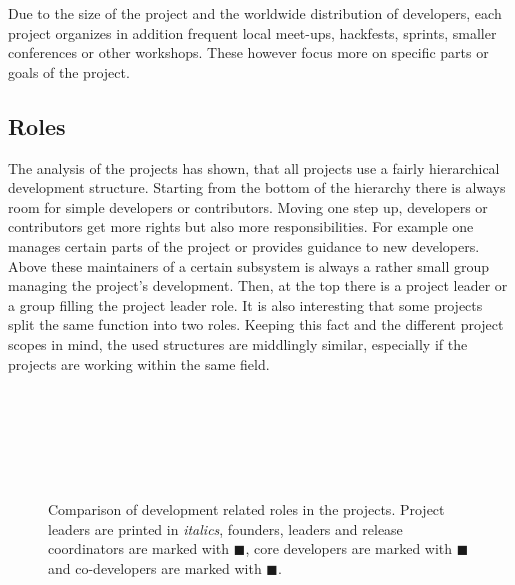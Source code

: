 Due to the size of the project and the worldwide distribution of developers,
each project organizes in addition frequent local meet-ups, hackfests, sprints,
smaller conferences or other workshops. These however focus more on
specific parts or goals of the project.


\subsection{Roles} %

The analysis of the projects has shown, that all projects use a fairly
hierarchical development structure. Starting from the bottom of the hierarchy
there is always room for simple developers or contributors. Moving one step up,
developers or contributors get more rights but also more responsibilities. For
example one manages certain parts of the project or provides guidance to new
developers. Above these maintainers of a certain subsystem is always a rather
small group managing the project's development. Then, at the top there is a
project leader or a group filling the project leader role. It is also
interesting that some projects split the same function into two roles. Keeping
this fact and the different project scopes in mind, the used structures are
middlingly similar, especially if the projects are working within the same
field.

\begin{figure}[htbp]
  \centering
   \qquad
   \\

   \qquad
   \\

   \qquad
   \\

   \qquad
   \\

   \qquad
   \\
  \caption[Comparison of Development Related Roles]
  {Comparison of development related roles in the projects. Project leaders are
    printed in \emph{italics}, founders, leaders and release coordinators are
    marked with \textcolor{skyblue3!110}{$\blacksquare$}, core developers are
    marked with \textcolor{skyblue2}{$\blacksquare$} and co-developers are
    marked with \textcolor{skyblue1}{$\blacksquare$}.}
\end{figure}

